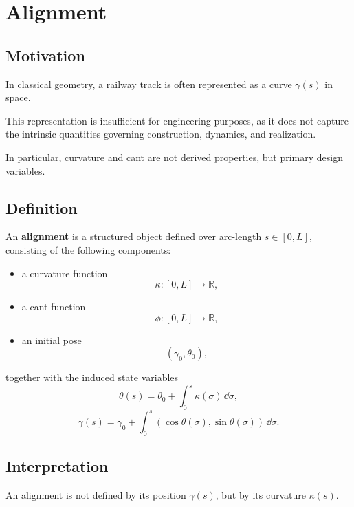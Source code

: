 
\section{Alignment}

\subsection{Motivation}

In classical geometry, a railway track is often represented as a curve
\(\gamma(s)\) in space.

This representation is insufficient for engineering purposes, as it
does not capture the intrinsic quantities governing construction,
dynamics, and realization.

In particular, curvature and cant are not derived properties, but
primary design variables.

\subsection{Definition}

\begin{definition}[Alignment]
An \textbf{alignment} is a structured object defined over arc-length
\(s \in [0,L]\), consisting of the following components:

\begin{itemize}
\item a curvature function
\[
\kappa : [0,L] \rightarrow \mathbb{R},
\]

\item a cant function
\[
\phi : [0,L] \rightarrow \mathbb{R},
\]

\item an initial pose
\[
(\gamma_0, \theta_0),
\]
\end{itemize}

together with the induced state variables
\[
\theta(s) = \theta_0 + \int_0^s \kappa(\sigma)\,\dd\sigma,
\]
\[
\gamma(s) = \gamma_0 + \int_0^s (\cos\theta(\sigma), \sin\theta(\sigma))\,\dd\sigma.
\]
\end{definition}

\subsection{Interpretation}

An alignment is not defined by its position \(\gamma(s)\), but by its
curvature \(\kappa(s)\).

